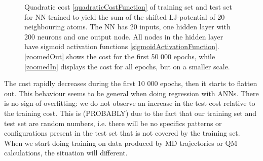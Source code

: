 \documentclass[twoside,english]{uiofysmaster}
\begin{document}
\begin{figure}[H]
\centering
{}
\caption{Quadratic cost \eqref{quadraticCostFunction} of training set and test set for NN trained to yield
	 the sum of the shifted LJ-potential of 20 neighbouring atoms. 
	 The NN has 20 inputs, one hidden layer 
	 with 200 neurons and one output node. All nodes in the hidden layer have sigmoid activation functions 
	 \eqref{sigmoidActivationFunction}. \autoref{zoomedOut} shows the cost for the first 50 000 epochs, while
	 \autoref{zoomedIn} displays the cost for all epochs, but on a smaller scale.}	 
\label{fig:trainingManyNeighbourNN}
\end{figure}
The cost rapidly decreases during the first 10 000 epochs, then it starts to flatten out. This behaviour seems
to be general when doing regression with ANNs. 
There is no sign of overfitting: we do not observe an increase in the test cost relative to the training cost. 
This is (PROBABLY) due to the fact that our training set and test set are random numbers, i.e. there will be no 
specifics patterns or configurations present in the test set that is not covered by the training set. 
When we start doing training on data produced by MD trajectories or QM calculations, the situation will different.
\end{document}
